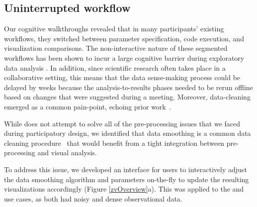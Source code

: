 \subsection{Uninterrupted workflow}
\par Our cognitive walkthroughs revealed that in many participants' existing workflows, they switched between parameter specification, code execution, and visualization comparisons. The non-interactive nature of these segmented workflows has been shown to incur a large cognitive barrier during exploratory data analysis \cite{Kery2017}. In addition, since scientific research often takes place in a collaborative setting, this means that the data sense-making process could be delayed by weeks because the analysis-to-results phases needed to be rerun offline based on changes that were suggested during a meeting. Moreover, data-cleaning emerged as a common pain-point, echoing prior work~\cite{kandel2012profiler,Guo2011}.

 While \zv does not attempt to solve all of the pre-processing issues that we faced during participatory design, we identified that data smoothing is a common data cleaning procedure~\cite{simonoff2012smoothing} that would benefit from a tight integration between pre-processing and visual analysis.  
\par To address this issue, we developed an interface for users to interactively adjust the data smoothing algorithm and parameters on-the-fly to update the resulting visualizations accordingly (Figure \ref{zvOverview}a). This was applied to the \matsci and \astro use cases, as both had noisy and dense observational data. 

